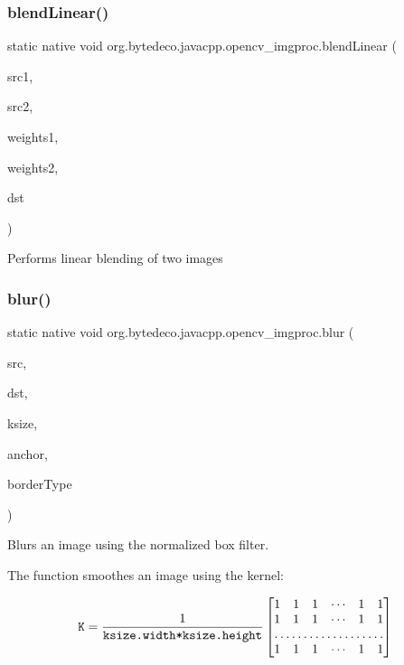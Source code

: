 \subsubsection{\texorpdfstring{blend\+Linear()}{blendLinear()}}
{\footnotesize\ttfamily static native void org.\+bytedeco.\+javacpp.\+opencv\+\_\+imgproc.\+blend\+Linear (\begin{DoxyParamCaption}\item[{@By\+Val Mat}]{src1,  }\item[{@By\+Val Mat}]{src2,  }\item[{@By\+Val Mat}]{weights1,  }\item[{@By\+Val Mat}]{weights2,  }\item[{@By\+Val Mat}]{dst }\end{DoxyParamCaption})\hspace{0.3cm}{\ttfamily [static]}}

Performs linear blending of two images \mbox{\label{group__imgproc__filter_ga2878e087c0294ad9e5f1996c07b303b4}} 
\subsubsection{\texorpdfstring{blur()}{blur()}}
{\footnotesize\ttfamily static native void org.\+bytedeco.\+javacpp.\+opencv\+\_\+imgproc.\+blur (\begin{DoxyParamCaption}\item[{@By\+Val Mat}]{src,  }\item[{@By\+Val Mat}]{dst,  }\item[{@By\+Val Size}]{ksize,  }\item[{@By\+Val(null\+Value=\char`\"{}cv\+::\+Point(-\/1,-\/1)\char`\"{}) Point}]{anchor,  }\item[{int}]{border\+Type }\end{DoxyParamCaption})\hspace{0.3cm}{\ttfamily [static]}}



Blurs an image using the normalized box filter. 

The function smoothes an image using the kernel\+: 

\[\texttt{K} = \frac{1}{\texttt{ksize.width*ksize.height}} \begin{bmatrix} 1 & 1 & 1 & \cdots & 1 & 1 \\ 1 & 1 & 1 & \cdots & 1 & 1 \\ \hdotsfor{6} \\ 1 & 1 & 1 & \cdots & 1 & 1 \\ \end{bmatrix}\] 

